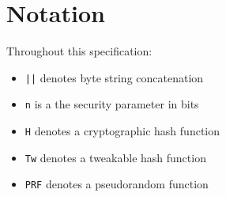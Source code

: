 \section{Notation}

Throughout this specification:

\begin{itemize}
    \item[] \texttt{||} \quad denotes byte string concatenation
    \item[] \texttt{n} \quad is a the security parameter in bits
    \item[] \texttt{H} \quad denotes a cryptographic hash function
    \item[] \texttt{Tw} \quad denotes a tweakable hash function
    \item[] \texttt{PRF} \quad denotes a pseudorandom function
\end{itemize}